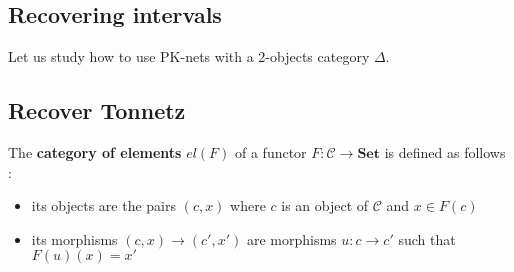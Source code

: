 \documentclass{report}
\begin{document}

\subsection{Recovering intervals}

Let us study how to use PK-nets with a 2-objects category $\Delta$.






\subsection{Recover Tonnetz}


\begin{defn} The \textbf{category of elements} $el(F)$ of a functor $F : \mathcal{C}\rightarrow \textbf{Set}$ is defined as follows :
    \begin{itemize}
        \item its objects are the pairs $(c,x)$ where $c$ is an object of $\mathcal{C}$ and $x\in F(c)$
        \item its morphisms $(c,x)\rightarrow (c',x')$ are morphisms $u : c\rightarrow c'$ such that $F(u)(x) = x'$
    \end{itemize}
\end{defn}
\end{document}
